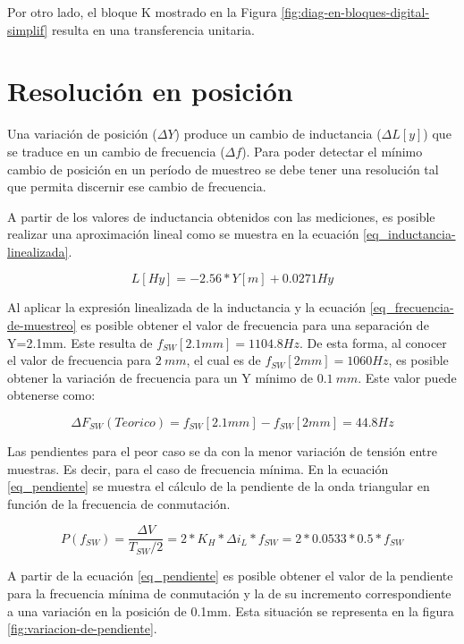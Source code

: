 \noindent Por otro lado, el bloque K mostrado en la Figura \ref{fig:diag-en-bloques-digital-simplif} resulta en una transferencia unitaria.

\section{Resolución en posición}

\noindent Una variación de posición ($\Delta Y$) produce un cambio de inductancia ($\Delta L[y]$) que se traduce en un cambio de frecuencia ($\Delta f$). Para poder detectar el mínimo cambio de posición en un período de muestreo se debe tener una resolución tal que permita discernir ese cambio de frecuencia.

\noindent A partir de los valores de inductancia  obtenidos con las mediciones, es posible realizar una aproximación lineal como se muestra en la ecuación \ref{eq_inductancia-linealizada}.

\begin{equation} \label{eq_inductancia-linealizada}
	L[Hy] = -2.56 * Y[m] + 0.0271 Hy
\end{equation}

\noindent Al aplicar la expresión linealizada de la inductancia y la ecuación \ref{eq_frecuencia-de-muestreo} es posible obtener el valor de frecuencia para una separación de Y=2.1mm. Este resulta de $f_{SW}[2.1mm] = 1104.8 Hz$. De esta forma, al conocer el valor de frecuencia para $2\:mm$, el cual es de $f_{SW}[2mm] = 1060 Hz$, es posible obtener la variación de frecuencia para un Y mínimo de $0.1\:mm$. Este valor puede obtenerse como:

\begin{equation} 
	\Delta F_{SW}(Teorico) = f_{SW}[2.1mm] - f_{SW}[2mm] = 44.8 Hz
\end{equation}

\noindent Las pendientes para el peor caso se da con la menor variación de tensión entre muestras. Es decir, para el caso de frecuencia mínima. En la ecuación \ref{eq_pendiente} se muestra el cálculo de la pendiente de la onda triangular en función de la frecuencia de conmutación.

\begin{equation} \label{eq_pendiente}
	P(f_{SW}) = \frac{\Delta V}{T_{SW}/2} = 2*K_H*\Delta i_L*f_{SW} = 2 * 0.0533 * 0.5 * f_{SW}
\end{equation}

\noindent A partir de la ecuación \ref{eq_pendiente} es posible obtener el valor de la pendiente para la frecuencia mínima de conmutación y la de su incremento correspondiente a una variación en la posición de 0.1mm. Esta situación se representa en la figura \ref{fig:variacion-de-pendiente}.

